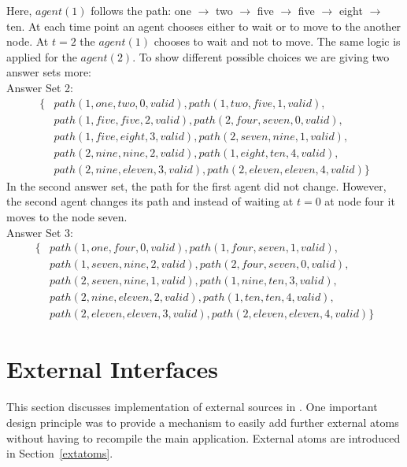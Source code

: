 \documentclass[a4paper, titlepage]{article}
\begin{document}
Here, $\mathit{agent(1)}$ follows the path:
one $\rightarrow$ two $\rightarrow$ five $\rightarrow$ five 
$\rightarrow$ eight $\rightarrow$ ten. At each time 
point an agent chooses either to wait or to move to 
the another node. At $t=2$ the $\mathit{agent(1)}$ chooses 
to wait and not to move. The same logic is applied for the 
$\mathit{agent(2)}$. To show different possible choices we are 
giving two answer sets more:
\\Answer Set 2:
\begin{align*}
\{ & path(1,one,two,0,valid),path(1,two,five,1,valid),
\\ & path(1,five,five,2,valid),path(2,four,seven,0,valid),
\\ & path(1,five,eight,3,valid),path(2,seven,nine,1,valid),
\\ & path(2,nine,nine,2,valid),path(1,eight,ten,4,valid),
\\ & 
path(2,nine,eleven,3,valid),path(2,eleven,eleven,4,valid)\}
\end{align*}
In the second answer set, the path for the first agent did not 
change. However, the second agent changes its path and instead 
of waiting at $t=0$ at node four it moves to the node 
seven.  
\\Answer Set 3:
\begin{align*}
\{ & path(1,one,four,0,valid), path(1,four,seven,1,valid),
\\ & path(1,seven,nine,2,valid), path(2,four,seven,0,valid),
\\ & path(2,seven,nine,1,valid), 
path(1,nine,ten,3,valid),
\\ & path(2,nine,eleven,2,valid), path(1,ten,ten,4,valid),
\\ & 
path(2,eleven,eleven,3,valid),path(2,eleven,eleven,4,valid) 
\}
\end{align*} 

\section{External Interfaces}
\label{sec:externalInterfaces}
This section discusses implementation of external sources in \dlvhex{}. One important design principle was to provide a 
mechanism to easily add further external atoms without 
having to recompile the main application. External atoms are introduced in Section~\ref{extatoms}.
 
\end{document}
